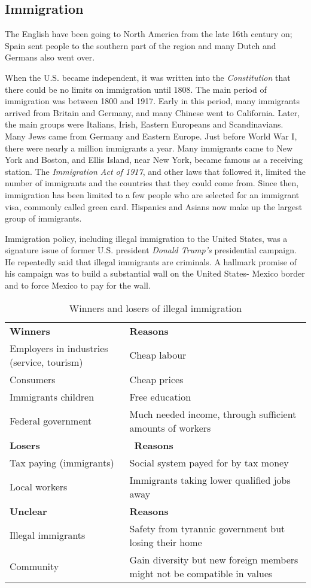 \documentclass[10pt]{article}
\begin{document}
\subsection{Immigration}
\label{sec:usa/immig}
The English have been going to North America from the late 16th century on; Spain sent people to the
southern part of the region and many Dutch and Germans also went over.

When the U.S. became independent, it was written into the \emph{Constitution} that there could be no
limits on immigration until 1808. The main period of immigration was between 1800 and 1917. Early
in this period, many immigrants arrived from Britain and Germany, and many Chinese went to
California. Later, the main groups were Italians, Irish, Eastern Europeans and Scandinavians. Many
Jews came from Germany and Eastern Europe. Just before World War I, there were nearly a million
immigrants a year. Many immigrants came to New York and Boston, and Ellis Island, near New York,
became famous as a receiving station. The \emph{Immigration Act of 1917}, and other laws that followed it,
limited the number of immigrants and the countries that they could come from. Since then,
immigration has been limited to a few people who are selected for an immigrant visa, commonly
called green card. Hispanics and Asians now make up the largest group of immigrants.

Immigration policy, including illegal immigration to the United States, was a signature issue of former
U.S. president \emph{Donald Trump's} presidential campaign. He repeatedly said that illegal immigrants are
criminals. A hallmark promise of his campaign was to build a substantial wall on the United States-
Mexico border and to force Mexico to pay for the wall.

\begin{table}[htbp]
	\centering
	\begin{tabularx}{\textwidth}{X|X}
		\hline
		{\sffamily\bfseries Winners} & {\sffamily\bfseries Reasons}\\
		Employers in industries (service, tourism) & Cheap labour \\
		Consumers & Cheap prices \\
		Immigrants children & Free education \\
		Federal government & Much needed income, through sufficient amounts of workers \\ \hline
		{\sffamily\bfseries Losers} & \ {\sffamily\bfseries Reasons}\\
		Tax paying (immigrants) & Social system payed for by tax money \\
		Local workers & Immigrants taking lower qualified jobs away \\ \hline
		{\sffamily\bfseries Unclear} & {\sffamily\bfseries Reasons}\\
		Illegal immigrants & Safety from tyrannic government but losing their home\\
		Community & Gain diversity but new foreign members might not be compatible in values \\ \hline
	\end{tabularx}
	\caption{Winners and losers of illegal immigration}
	\label{tab:usa/immig/win}
\end{table}
\end{document}

